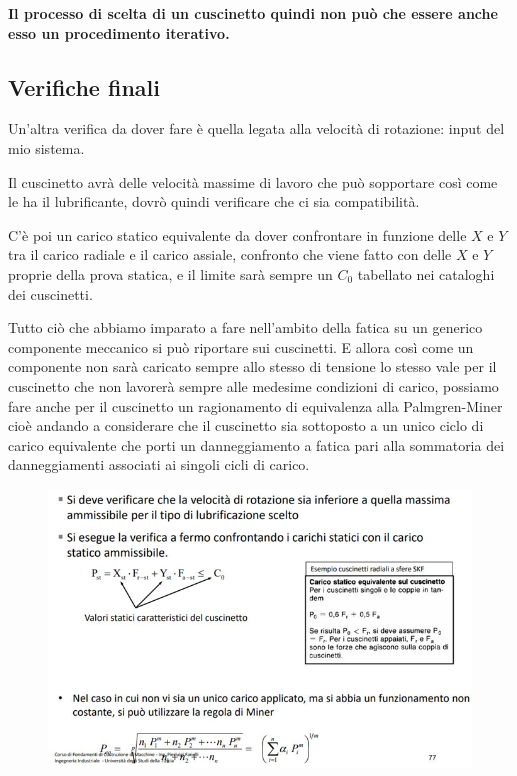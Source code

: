 \documentclass[a4paper, 15pt]{article}
\begin{document}
			\begin{center}
				\textbf{Il processo di scelta di un cuscinetto quindi non può che essere anche esso un procedimento iterativo.}
			\end{center}
			
			\subsection{Verifiche finali}
			Un’altra verifica da dover fare è quella legata alla velocità di rotazione: input del mio sistema.
			
			
			Il cuscinetto avrà delle velocità massime di lavoro che può sopportare così come le ha il lubrificante, dovrò quindi verificare che ci sia compatibilità. \newline 
			
			C’è poi un carico statico equivalente da dover confrontare in funzione delle $X$ e $Y$ tra il carico radiale e il carico assiale, confronto che viene fatto con delle $X$ e $Y$ proprie della prova statica, e il limite sarà sempre un $C_0$ tabellato nei cataloghi dei cuscinetti. \newline 
			
			Tutto ciò che abbiamo imparato a fare nell’ambito della fatica su un generico componente meccanico si può riportare sui cuscinetti.
			E allora così come un componente non sarà caricato sempre allo stesso di tensione lo stesso vale per il cuscinetto che non lavorerà sempre alle medesime condizioni di carico, possiamo fare anche per il cuscinetto un ragionamento di equivalenza alla Palmgren-Miner cioè andando a considerare che il cuscinetto sia sottoposto a un unico ciclo di carico equivalente che porti un danneggiamento a fatica pari alla sommatoria dei danneggiamenti associati ai singoli cicli di carico.
			\begin{figure}[H]
				\centering
				\includegraphics[width=0.5\linewidth]{immagini/screenshot023}
				\label{fig:screenshot023}
			\end{figure}
			
			
					
		
\end{document}
